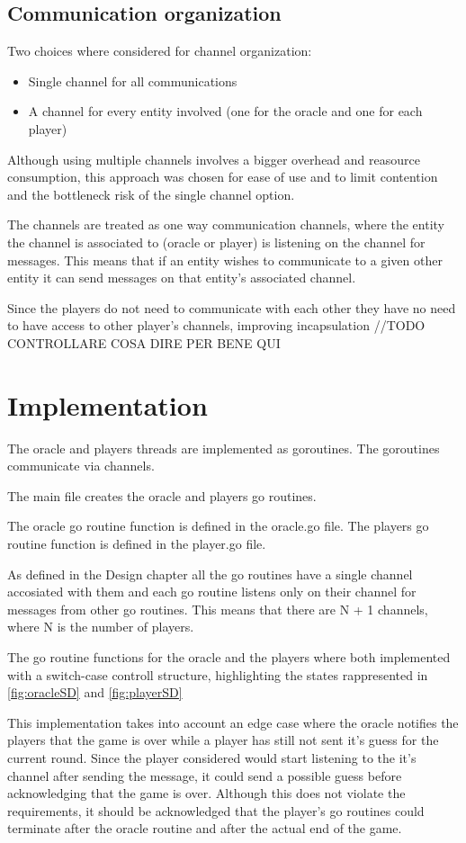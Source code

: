 \documentclass[12pt, a4paper]{report}
\begin{document}
\section{Communication organization}
Two choices where considered for channel organization:
\begin{itemize}
    \item Single channel for all communications
    \item A channel for every entity involved (one for the oracle and one for each player)
\end{itemize}

\newpage

Although using multiple channels involves a bigger overhead and reasource consumption, this approach was chosen for ease of use and to limit contention and
 the bottleneck risk of the single channel option.

The channels are treated as one way communication channels, where the entity the channel is associated to (oracle or player) is listening on the channel for messages.
 This means that if an entity wishes to communicate to a given other entity it can send messages on that entity's associated channel.

Since the players do not need to communicate with each other they have no need to have access to other player's channels, improving incapsulation //TODO CONTROLLARE COSA DIRE PER BENE QUI
\chapter{Implementation}
The oracle and players threads are implemented as goroutines. The goroutines communicate via channels.

The main file creates the oracle and players go routines.

The oracle go routine function is defined in the oracle.go file. The players go routine function is defined in the player.go file.

As defined in the Design chapter all the go routines have a single channel accosiated with them and each go routine listens only on their channel for messages from
 other go routines. This means that there are N + 1 channels, where N is the number of players.

The go routine functions for the oracle and the players where both implemented with a switch-case controll structure, highlighting the states
 rappresented in \ref{fig:oracleSD} and \ref{fig:playerSD}

This implementation takes into account an edge case where the oracle notifies the players that the game is over while a player has still not sent it's guess
 for the current round. Since the player considered would start listening to the it's channel after sending the message, it could send a possible guess
 before acknowledging that the game is over. Although this does not violate the requirements, it should be acknowledged that the player's go routines
 could terminate after the oracle routine and after the actual end of the game.
\end{document}
